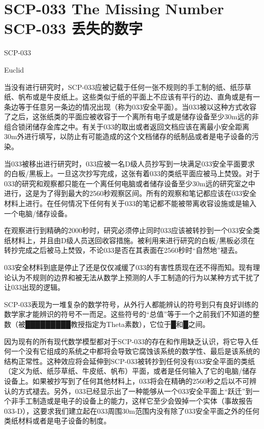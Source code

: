 \chapter[SCP-033 丢失的数字]{
    SCP-033 The Missing Number\\
    SCP-033 丢失的数字
}

\label{chap:SCP-033}

SCP-033

Euclid

当没有进行研究时，SCP-033应被记载于任何一张不规则的手工制的纸、纸莎草纸、帆布或是牛皮纸上。这些类似于纸的平面上不应该有平行的边、直角或是有一条边等于任意另一条边的情况出现（称为033安全平面）。当033被以这种方式收容了之后，这张纸类的平面应被收容于一个离所有电子或是储存设备至少30m远的非组合锁闭储存金库之中。有关于033的取出或者返回文档应该在离最小安全距离30m外进行填写，以防止有可能造成的这个文档储存的纸制品或者是电子设备的污染。

当033被移出进行研究时，033应被一名D级人员抄写到一块满足033安全平面要求的白板\slash 黑板上。一旦这次抄写完成，这张有着033的类纸平面应被马上焚毁。对于033的研究和观察都只能在一个离任何电脑或者储存设备至少30m远的研究室之中进行，这是为了得到最大的2560秒观察区间。所有的观察和笔记都应该在033安全材料上进行。在任何情况下任何有关于033的笔记都不能被带离收容设施或是输入一个电脑\slash 储存设备。

在观察进行到精确的2000秒时，研究必须停止同时033应该被转抄到一个033安全类纸材料上，并且由D级人员送回收容措施。被利用来进行研究的白板\slash 黑板必须在转抄完成之后被马上焚毁，不论033是否在其表面在2560秒时“自然地”褪去。

033安全材料到底是停止了还是仅仅减缓了033的有害性质现在还不得而知。现有理论认为不规则的边界和被无法从数学上预测的人手工制造的行为以某种方式干扰了让033出现的逻辑。

SCP-033表现为一堆复杂的数学符号，从外行人都能辨认的符号到只有良好训练的数学家才能辨识的符号不一而足。这些符号的“总值”等于一个之前我们不知道的整数（被█████████教授指定为Theta素数），它位于█和█之间。

因为现有的所有现代数学模型都对于SCP-033的存在和作用缺乏认识，将它导入任何一个没有它组成的系统之中都将会导致它腐蚀该系统的数学性、最后是该系统的结构正常性。这种效应将会延伸到SCP-033被转抄到任何没有033安全平面的类纸（定义为纸、纸莎草纸、牛皮纸、帆布）平面，或者是任何输入了它的电脑\slash 储存设备上。如果被抄写到了任何其他材料上，033将会在精确的2560秒之后以不可辨认的方式褪去。另外，033已经显示出了一种能够从一个033安全平面上“跃迁”到一个非手工制造或是电子的设备上的能力，这样它至少会毁掉一个实体（事故报告033-D），这要求我们建立起在033周围30m范围内没有除了033安全平面之外的任何类纸材料或者是电子设备的制度。

